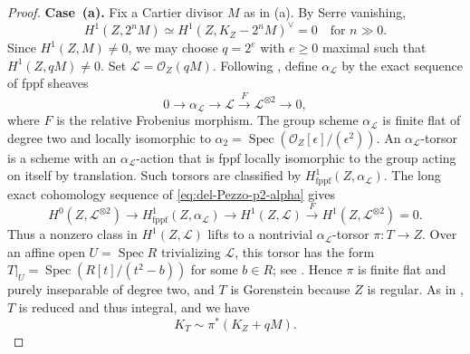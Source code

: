 \documentclass[10pt,abstract=true]{scrartcl}
\numberwithin{equation}{section}
\theoremstyle{definition}
\theoremstyle{remark}
\begin{document}
\begin{proof}
  \par\smallskip
  \noindent\textbf{Case~\textup{(a)}.}
  Fix a Cartier divisor $M$ as in \textup{(a)}.
  By Serre vanishing,
  \[
    H^1(Z,2^nM)
    \simeq H^1(Z,K_Z-2^nM)^\vee=0
    \quad\text{for } n\gg0.
  \]
  Since $H^1(Z,M) \ne 0$, we may choose $q=2^e$ with $e \geq 0$ maximal such that $H^1(Z,qM)\ne0$.
  Set $\mathscr L = \mathcal O_Z(qM)$.
  Following \cite[I, (1.5)]{ekedahl_canonical_1988}, define $\alpha_{\mathscr L}$ by the exact sequence of fppf sheaves
  \begin{equation}\label{eq:del-Pezzo-p2-alpha}
    0\longrightarrow\alpha_{\mathscr L}
      \longrightarrow\mathscr L
      \xrightarrow{F}\mathscr L^{\otimes2}
      \longrightarrow0,
  \end{equation}
  where $F$ is the relative Frobenius morphism.
  The group scheme $\alpha_{\mathscr L}$ is finite flat of degree two and locally isomorphic to $\alpha_2=\operatorname{Spec}(\mathcal O_Z[\epsilon]/(\epsilon^2))$.
  An $\alpha_{\mathscr L}$-torsor is a scheme with an $\alpha_{\mathscr L}$-action that is fppf locally isomorphic to the group acting on itself by translation.
  Such torsors are classified by $H^1_{\mathrm{fppf}}(Z,\alpha_{\mathscr L})$.
  The long exact cohomology sequence of \eqref{eq:del-Pezzo-p2-alpha} gives
  \[
    H^0(Z,\mathscr L^{\otimes2})
      \longrightarrow H^1_{\mathrm{fppf}}(Z,\alpha_{\mathscr L})
      \longrightarrow H^1(Z,\mathscr L)
      \xrightarrow{F} H^1(Z,\mathscr L^{\otimes2})=0.
  \]
  Thus a nonzero class in $H^1(Z,\mathscr L)$ lifts to a nontrivial $\alpha_{\mathscr L}$-torsor $\pi\colon T\to Z$.
  Over an affine open $U=\operatorname{Spec}R$ trivializing $\mathscr L$, this torsor has the form $T|_U=\operatorname{Spec}(R[t]/(t^2-b))$ for some $b\in R$; see \cite[I, p.~106]{ekedahl_canonical_1988}.
  Hence $\pi$ is finite flat and purely inseparable of degree two, and $T$ is Gorenstein because $Z$ is regular.
  As in \cite[I, Proposition~1.7]{ekedahl_canonical_1988}, $T$ is reduced and thus integral, and we have
  \begin{equation}\label{eq:del-Pezzo-p2-torsor}
    K_T\sim\pi^*(K_Z+qM).
  \end{equation}


\end{proof}
\end{document}
